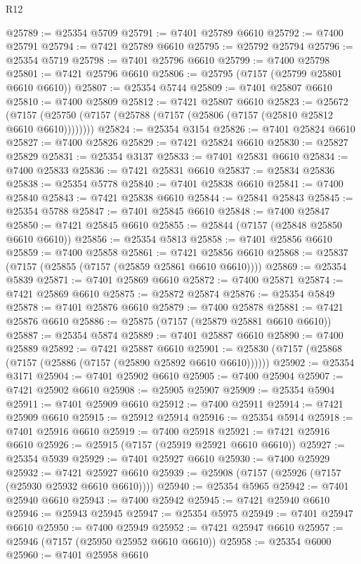 \begin{lexlean}{R12}
\begin{coremodule}
{{{{{{{{{{{{{{{{{{{{{{{{{{{{{{{{{{{{{{{{{{{{{{{{{{{{{{{{{{{{{{{{{{{{{{{{{{{{{{{{{{@25789 := @25354 @5709
@25791 := @7401 @25789 @6610
@25792 := @7400 @25791
@25794 := @7421 @25789 @6610
@25795 := @25792 @25794
@25796 := @25354 @5719
@25798 := @7401 @25796 @6610
@25799 := @7400 @25798
@25801 := @7421 @25796 @6610
@25806 := @25795 (@7157 (@25799 @25801 @6610 @6610))
@25807 := @25354 @5744
@25809 := @7401 @25807 @6610
@25810 := @7400 @25809
@25812 := @7421 @25807 @6610
@25823 := @25672
    (@7157 (@25750 (@7157 (@25788 (@7157 (@25806 (@7157 (@25810 @25812 @6610 @6610))))))))
@25824 := @25354 @3154
@25826 := @7401 @25824 @6610
@25827 := @7400 @25826
@25829 := @7421 @25824 @6610
@25830 := @25827 @25829
@25831 := @25354 @3137
@25833 := @7401 @25831 @6610
@25834 := @7400 @25833
@25836 := @7421 @25831 @6610
@25837 := @25834 @25836
@25838 := @25354 @5778
@25840 := @7401 @25838 @6610
@25841 := @7400 @25840
@25843 := @7421 @25838 @6610
@25844 := @25841 @25843
@25845 := @25354 @5788
@25847 := @7401 @25845 @6610
@25848 := @7400 @25847
@25850 := @7421 @25845 @6610
@25855 := @25844 (@7157 (@25848 @25850 @6610 @6610))
@25856 := @25354 @5813
@25858 := @7401 @25856 @6610
@25859 := @7400 @25858
@25861 := @7421 @25856 @6610
@25868 := @25837 (@7157 (@25855 (@7157 (@25859 @25861 @6610 @6610))))
@25869 := @25354 @5839
@25871 := @7401 @25869 @6610
@25872 := @7400 @25871
@25874 := @7421 @25869 @6610
@25875 := @25872 @25874
@25876 := @25354 @5849
@25878 := @7401 @25876 @6610
@25879 := @7400 @25878
@25881 := @7421 @25876 @6610
@25886 := @25875 (@7157 (@25879 @25881 @6610 @6610))
@25887 := @25354 @5874
@25889 := @7401 @25887 @6610
@25890 := @7400 @25889
@25892 := @7421 @25887 @6610
@25901 := @25830 (@7157 (@25868 (@7157 (@25886 (@7157 (@25890 @25892 @6610 @6610))))))
@25902 := @25354 @3171
@25904 := @7401 @25902 @6610
@25905 := @7400 @25904
@25907 := @7421 @25902 @6610
@25908 := @25905 @25907
@25909 := @25354 @5904
@25911 := @7401 @25909 @6610
@25912 := @7400 @25911
@25914 := @7421 @25909 @6610
@25915 := @25912 @25914
@25916 := @25354 @5914
@25918 := @7401 @25916 @6610
@25919 := @7400 @25918
@25921 := @7421 @25916 @6610
@25926 := @25915 (@7157 (@25919 @25921 @6610 @6610))
@25927 := @25354 @5939
@25929 := @7401 @25927 @6610
@25930 := @7400 @25929
@25932 := @7421 @25927 @6610
@25939 := @25908 (@7157 (@25926 (@7157 (@25930 @25932 @6610 @6610))))
@25940 := @25354 @5965
@25942 := @7401 @25940 @6610
@25943 := @7400 @25942
@25945 := @7421 @25940 @6610
@25946 := @25943 @25945
@25947 := @25354 @5975
@25949 := @7401 @25947 @6610
@25950 := @7400 @25949
@25952 := @7421 @25947 @6610
@25957 := @25946 (@7157 (@25950 @25952 @6610 @6610))
@25958 := @25354 @6000
@25960 := @7401 @25958 @6610
}}}}}}}}}}}}}}}}}}}}}}}}}}}}}}}}}}}}}}}}}}}}}}}}}}}}}}}}}}}}}}}}}}}}}}}}}}}}}}}}}}
\end{coremodule}
\end{lexlean}
